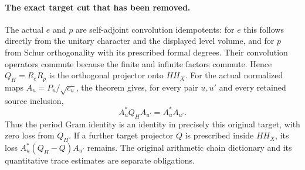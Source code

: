 \paragraph{The exact target cut that has been removed.}
The actual $e$ and $p$ are self-adjoint convolution idempotents:
for $e$ this follows directly from the unitary character and
the displayed level volume, and for $p$ from Schur orthogonality
with its prescribed formal degrees.  Their convolution operators
commute because the finite and infinite factors commute.
Hence $Q_H=R_eR_p$ is the orthogonal projector onto $HH_X$.
For the actual normalized maps $A_u=P_u/\sqrt{c_u}$, the theorem
gives, for every pair $u,u'$ and every retained source inclusion,
\[
                  A_u^*Q_HA_{u'}=A_u^*A_{u'}.
\]
Thus the period Gram identity is an identity in precisely this
original target, with zero loss from $Q_H$.  If a further
target projector $Q$ is prescribed inside $HH_X$, its loss
$A_u^*(Q_H-Q)A_{u'}$ remains.  The original arithmetic chain
dictionary and its quantitative trace estimates are separate
obligations.
